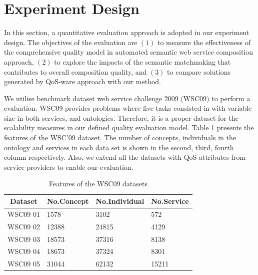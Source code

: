 \documentclass{llncs}
\begin{document}
\section{Experiment Design}\label{experiment_design}
In this section, a quantitative evaluation approach is adopted in our experiment design. The objectives of the evaluation are $(1)$ to measure the effectiveness of the comprehensive quality model in automated semantic web service composition approach, $(2)$ to explore the impacts of the semantic matchmaking that contributes to overall composition quality, and $(3)$ to compare solutions generated by QoS-ware approach with our method.

We utilise benchmark dataset web service challenge 2009 (WSC09) \cite{kona2009wsc} to perform a evaluation. WSC09 provides problems where five tasks consisted in with variable size in both services, and ontologies. Therefore, it is a proper dataset for the scalability measures in our defined quality evaluation model. Table \ref{wsc09datasetTable} presents the features of the WSC’09 dataset. The number of concepts, individuals in the ontology and services in each data set is shown in the second, third, fourth column respectively. Also, we extend all the datasets with QoS attributes from service providers to enable our evaluation. 
\begin{table}[]
\centering
\caption{Features of the WSC09 datasets}
\label{wsc09datasetTable}
\begin{tabular}{l|l|l|l}
\hline
\multicolumn{1}{c|}{Dataset} & No.Concept & No.Individual & No.Service \\ \hline
WSC09 01                     & 1578       &3102           &572      \\ \hline
WSC09 02                     & 12388      &24815          &4129      \\ \hline
WSC09 03                     & 18573      &37316          &8138      \\ \hline
WSC09 04                     & 18673      &37324          &8301      \\ \hline
WSC09 05                     & 31044      &62132          &15211    \\ \hline
\end{tabular}
\end{table}
\end{document}
